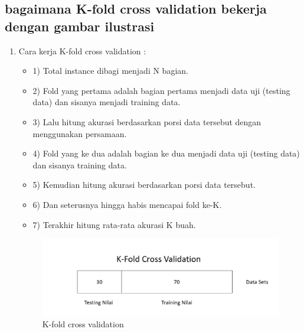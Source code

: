 \subsection{bagaimana K-fold cross validation bekerja dengan gambar ilustrasi}
\begin{enumerate}
\item Cara kerja K-fold cross validation :
\begin{itemize}
\item 1)	Total instance dibagi menjadi N bagian.
\item 2)	Fold yang pertama adalah bagian pertama menjadi data uji (testing data) dan sisanya menjadi training data.
\item 3)	Lalu hitung akurasi berdasarkan porsi data tersebut dengan menggunakan persamaan.
\item 4)	Fold yang ke dua adalah bagian ke dua menjadi data uji (testing data) dan sisanya training data. 
\item 5)	Kemudian hitung akurasi berdasarkan porsi data tersebut.
\item 6)	Dan seterusnya hingga habis mencapai fold ke-K.
\item 7)	Terakhir hitung rata-rata akurasi K buah.
\end{itemize}
\begin{figure}[ht]
\centering
\includegraphics[scale=1]{figures/andi/no5.PNG}
\caption{K-fold cross validation}
\label{contoh}
\end{figure}
\end{enumerate}

